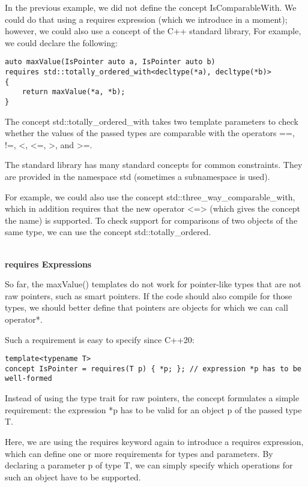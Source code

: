 In the previous example, we did not define the concept IsComparableWith. We could do that using a requires expression (which we introduce in a moment); however, we could also use a concept of the C++ standard library, For example, we could declare the following:

\begin{lstlisting}[style=styleCXX]
auto maxValue(IsPointer auto a, IsPointer auto b)
requires std::totally_ordered_with<decltype(*a), decltype(*b)>
{
	return maxValue(*a, *b);
}
\end{lstlisting}

The concept std::totally\_ordered\_with takes two template parameters to check whether the values of the passed types are comparable with the operators ==, !=, <, <=, >, and >=.

The standard library has many standard concepts for common constraints. They are provided in the namespace std (sometimes a subnamespace is used).

For example, we could also use the concept std::three\_way\_comparable\_with, which in addition requires that the new operator <=> (which gives the concept the name) is supported. To check support for comparisons of two objects of the same type, we can use the concept std::totally\_ordered.

\noindent
\hspace*{\fill} \\ %
\textbf{requires Expressions}

So far, the maxValue() templates do not work for pointer-like types that are not raw pointers, such as smart pointers. If the code should also compile for those types, we should better define that pointers are objects for which we can call operator*.

Such a requirement is easy to specify since C++20:

\begin{lstlisting}[style=styleCXX]
template<typename T>
concept IsPointer = requires(T p) { *p; }; // expression *p has to be well-formed
\end{lstlisting}

Instead of using the type trait for raw pointers, the concept formulates a simple requirement: the expression *p has to be valid for an object p of the passed type T.

Here, we are using the requires keyword again to introduce a requires expression, which can define one or more requirements for types and parameters. By declaring a parameter p of type T, we can simply specify which operations for such an object have to be supported.

